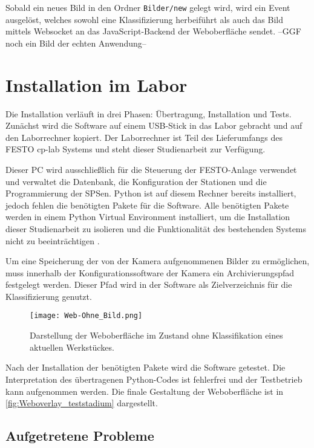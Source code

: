 Sobald ein neues Bild in den Ordner \texttt{Bilder/new} gelegt wird, wird ein Event ausgelöst, welches sowohl eine Klassifizierung herbeiführt als auch das Bild mittels Websocket an das JavaScript-Backend der Weboberfläche sendet. --GGF noch ein Bild der echten Anwendung--

\section{Installation im Labor} \label{sec:installation}

Die Installation verläuft in drei Phasen: Übertragung, Installation und Tests.
Zunächst wird die Software auf einem \ac{USB}-Stick in das Labor gebracht und auf den Laborrechner kopiert. 
Der Laborrechner ist Teil des Lieferumfangs des FESTO \ac{cp-lab} Systems und steht dieser Studienarbeit zur Verfügung.

Dieser \Ac{PC} wird ausschließlich für die Steuerung der FESTO-Anlage verwendet und verwaltet die Datenbank, die Konfiguration der Stationen und die Programmierung der \ac{SPS}en. 
Python ist auf diesem Rechner bereits installiert, jedoch fehlen die benötigten Pakete für die Software. 
Alle benötigten Pakete werden in einem Python Virtual Environment installiert, um die Installation dieser Studienarbeit zu isolieren und die Funktionalität des bestehenden Systems nicht zu beeinträchtigen \cite{python_software_foundation_venv_nodate}.

Um eine Speicherung der von der Kamera aufgenommenen Bilder zu ermöglichen, muss innerhalb der Konfigurationssoftware der Kamera ein Archivierungspfad festgelegt werden. Dieser Pfad wird in der Software als Zielverzeichnis für die Klassifizierung genutzt. 

\begin{figure}[H]
    \centering
    \texttt{[image: Web-Ohne\_Bild.png]}
    \caption{Darstellung der Weboberfläche im Zustand ohne Klassifikation eines aktuellen Werkstückes.}
    \label{fig:Weboverlay_teststadium}
\end{figure}

Nach der Installation der benötigten Pakete wird die Software getestet. Die Interpretation des übertragenen Python-Codes ist fehlerfrei und der Testbetrieb kann aufgenommen werden. Die finale Gestaltung der Weboberfläche ist in \autoref{fig:Weboverlay_teststadium} dargestellt.

\subsection{Aufgetretene Probleme} \label{subsec:aufgetretene_probleme}

